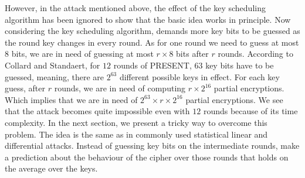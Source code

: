 \par \noindent However, in the attack mentioned above, the effect of the key scheduling algorithm has been ignored to show that the basic idea works in principle. Now considering the key scheduling algorithm, demands more key bits to be guessed as the round key changes in every round. As for one round we need to guess at most $8$ bits, we are in need of guessing at most $r \times 8$ bits after $r$ rounds. According to Collard and Standaert, for $12$ rounds of PRESENT, $63$ key bits have to be guessed, meaning, there are $2^{63}$ different possible keys in effect. For each key guess, after $r$ rounds, we are in need of computing $r \times 2^{16}$ partial encryptions. Which implies that we are in need of $2^{63} \times r \times 2^{16}$ partial encryptions. We see that the attack becomes quite impossible even with $12$ rounds because of its time complexity. In the next section, we present a tricky way to overcome this problem. The idea is the same as in commonly used statistical linear and differential attacks. Instead of guessing key bits on the intermediate rounds, make a prediction about the behaviour of the cipher over those rounds that holds on the average over the keys.

